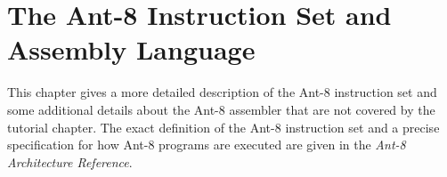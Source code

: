 %

\chapter{The {\sc Ant-8} Instruction Set and Assembly Language}
\label{ant-chapter}

This chapter gives a more detailed description of the {\sc Ant-8}
 instruction set and some additional details
about the {\sc Ant-8} assembler that are not covered by the tutorial
chapter.  The exact definition of the {\sc Ant-8} instruction set and a
precise specification for how {\sc Ant-8} programs are executed are
given in the {\em {\sc Ant-8}  Architecture
Reference}.






